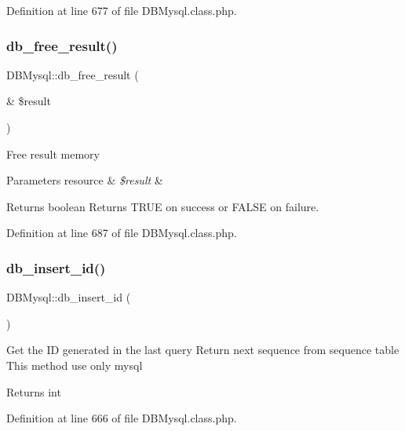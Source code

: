 Definition at line 677 of file D\+B\+Mysql.\+class.\+php.

\hypertarget{classDBMysql_a0d907e935bcfafa845fd39640dcc60cf}{}\label{classDBMysql_a0d907e935bcfafa845fd39640dcc60cf} 
\subsubsection{\texorpdfstring{db\+\_\+free\+\_\+result()}{db\_free\_result()}}
{\footnotesize\ttfamily D\+B\+Mysql\+::db\+\_\+free\+\_\+result (\begin{DoxyParamCaption}\item[{\&}]{\$result }\end{DoxyParamCaption})}

Free result memory 
\begin{DoxyParams}[1]{Parameters}
resource & {\em \$result} & \\
\hline
\end{DoxyParams}
\begin{DoxyReturn}{Returns}
boolean Returns T\+R\+UE on success or F\+A\+L\+SE on failure. 
\end{DoxyReturn}


Definition at line 687 of file D\+B\+Mysql.\+class.\+php.

\hypertarget{classDBMysql_a21acddd922e39574922f60b881add658}{}\label{classDBMysql_a21acddd922e39574922f60b881add658} 
\subsubsection{\texorpdfstring{db\+\_\+insert\+\_\+id()}{db\_insert\_id()}}
{\footnotesize\ttfamily D\+B\+Mysql\+::db\+\_\+insert\+\_\+id (\begin{DoxyParamCaption}{ }\end{DoxyParamCaption})}

Get the ID generated in the last query Return next sequence from sequence table This method use only mysql \begin{DoxyReturn}{Returns}
int 
\end{DoxyReturn}


Definition at line 666 of file D\+B\+Mysql.\+class.\+php.

